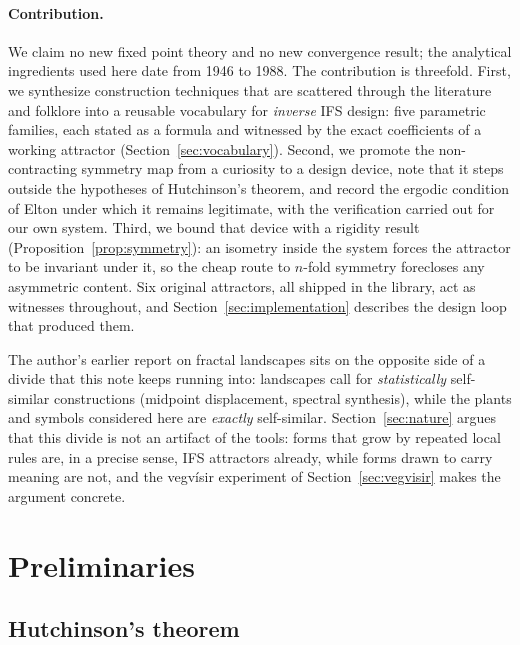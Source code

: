 \documentclass[11pt,a4paper]{article}
\theoremstyle{remark}
\begin{document}
\paragraph{Contribution.}
We claim no new fixed point theory and no new convergence result; the
analytical ingredients used here date from 1946 to 1988. The contribution is
threefold. First, we synthesize construction techniques that are scattered
through the literature and folklore into a reusable vocabulary for
\emph{inverse} IFS design: five parametric families, each stated as a formula
and witnessed by the exact coefficients of a working attractor
(Section~\ref{sec:vocabulary}). Second, we promote the non-contracting
symmetry map from a curiosity to a design device, note that it steps outside
the hypotheses of Hutchinson's theorem, and record the ergodic condition of
Elton \cite{elton1987,barnsleyelton1988} under which it remains legitimate,
with the verification carried out for our own system. Third, we bound that
device with a rigidity result (Proposition~\ref{prop:symmetry}): an isometry
inside the system forces the attractor to be invariant under it, so the cheap
route to $n$-fold symmetry forecloses any asymmetric content. Six original
attractors, all shipped in the library, act as witnesses throughout, and
Section~\ref{sec:implementation} describes the design loop that produced
them.

The author's earlier report on fractal landscapes \cite{bonhomme2008paysagesfractals} sits on
the opposite side of a divide that this note keeps running into: landscapes
call for \emph{statistically} self-similar constructions (midpoint
displacement, spectral synthesis), while the plants and symbols considered
here are \emph{exactly} self-similar. Section~\ref{sec:nature} argues that
this divide is not an artifact of the tools: forms that grow by repeated
local rules are, in a precise sense, IFS attractors already, while forms
drawn to carry meaning are not, and the vegvísir experiment of
Section~\ref{sec:vegvisir} makes the argument concrete.

\section{Preliminaries}
\label{sec:preliminaries}

\subsection{Hutchinson's theorem}
\end{document}
